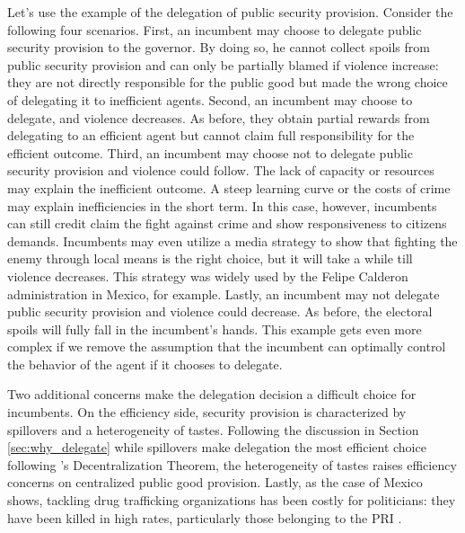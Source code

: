\documentclass[12pt]{amsart}
\makeatletter
\def\subsection{\@startsection{subsection}{2}
	\z@{.8\linespacing\@plus.7\linespacing}{.7\linespacing}{\large}}
\numberwithin{equation}{section}
\theoremstyle{definition}
\theoremstyle{definition}
\theoremstyle{definition}
\makeatother
\begin{document}
Let’s use the example of the delegation of public security provision. Consider the following four scenarios. First, an incumbent may choose to delegate public security provision to the governor. By doing so, he cannot collect spoils from public security provision and can only be partially blamed if violence increase: they are not directly responsible for the public good but made the wrong choice of delegating it to inefficient agents. Second, an incumbent may choose to delegate, and violence decreases. As before, they obtain partial rewards from delegating to an efficient agent but cannot claim full responsibility for the efficient outcome. Third, an incumbent may choose not to delegate public security provision and violence could follow. The lack of capacity or resources may explain the inefficient outcome. A steep learning curve or the costs of crime may explain inefficiencies in the short term. In this case, however, incumbents can still credit claim the fight against crime and show responsiveness to citizens demands. Incumbents may even utilize a media strategy to show that fighting the enemy through local means is the right choice, but it will take a while till violence decreases. This strategy was widely used by the Felipe Calderon administration in Mexico, for example.  Lastly, an incumbent may not delegate public security provision and violence could decrease. As before, the electoral spoils will fully fall in the incumbent’s hands. This example gets even more complex if we remove the assumption that the incumbent can optimally control the behavior of the agent if it chooses to delegate. 
   
Two additional concerns make the delegation decision a difficult choice for incumbents. On the efficiency side, security provision is characterized by spillovers and a heterogeneity of tastes. Following the discussion in Section \ref{sec:why_delegate}  while spillovers make delegation the most efficient choice following \citet{oates_1972}'s Decentralization Theorem, the heterogeneity of tastes raises efficiency concerns on centralized public good provision. Lastly, as the case of Mexico shows, tackling drug trafficking organizations has been costly for politicians: they have been killed in high rates, particularly those belonging to the PRI \citep{ley_trejo_2020}.  

        
\subsection{Hypotheses \label{sec:hypotheses}}
\end{document}
